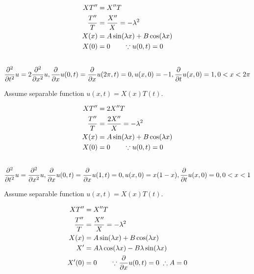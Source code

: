 \documentclass[12pt,USLetter]{article}
\begin{document}
\begin{align*}
XT^{\prime\prime} &= X^{\prime\prime} T \\
\frac{T^{\prime\prime}}{T} &= \frac{X^{\prime\prime}}{X} = -\lambda^2 \\
X(x) &= A\sin(\lambda x) + B\cos(\lambda x) \\
X(0) &= 0 \qquad \because u(0,t) = 0
\end{align*}

\subsection{}

\begin{equation*}
\frac{\partial^2}{\partial{t}^2}u = 2\frac{\partial^2}{\partial{x}^2}u, \frac{\partial}{\partial{x}}u(0,t) = \frac{\partial}{\partial{x}}u(2\pi,t) = 0, u(x,0) = -1, \frac{\partial}{\partial{t}}u(x, 0) = 1, 0<x<2\pi
\end{equation*}

Assume separable function $u(x,t) = X(x)T(t)$.

\begin{align*}
XT^{\prime\prime} &= 2X^{\prime\prime} T \\
\frac{T^{\prime\prime}}{T} &= \frac{2X^{\prime\prime}}{X} = -\lambda^2 \\
X(x) &= A\sin(\lambda x) + B\cos(\lambda x) \\
X(0) &= 0 \qquad \because u(0,t) = 0
\end{align*}

\subsection{}

\begin{equation*}
\frac{\partial^2}{\partial{t}^2}u = \frac{\partial^2}{\partial{x}^2}u, \frac{\partial}{\partial{x}}u(0,t) = \frac{\partial}{\partial{x}}u(1,t) = 0, u(x,0) = x(1-x), \frac{\partial}{\partial{t}}u(x, 0) = 0, 0<x<1
\end{equation*}

Assume separable function $u(x,t) = X(x)T(t)$.

\begin{align*}
XT^{\prime\prime} &= X^{\prime\prime} T \\
\frac{T^{\prime\prime}}{T} &= \frac{X^{\prime\prime}}{X} = -\lambda^2 \\
X(x) &= A\sin(\lambda x) + B\cos(\lambda x) \\
X^{\prime} &= A\lambda\cos(\lambda x) - B\lambda\sin(\lambda x) \\
X^{\prime}(0) &= 0 \qquad \because \frac{\partial}{\partial{x}}u(0,t) = 0 \; \therefore A=0 \\
\end{align*}
\end{document}
